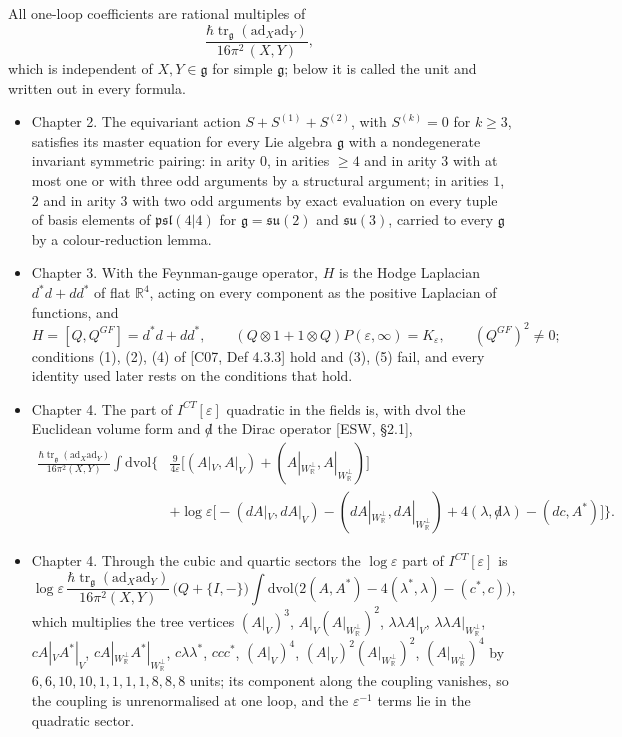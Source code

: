 All one-loop coefficients are rational multiples of
\[
\frac{\hbar\operatorname{tr}_{\mathfrak g}(\mathrm{ad}_X\mathrm{ad}_Y)}{16\pi^2\,(X,Y)},
\]
which is independent of $X,Y\in\mathfrak g$ for simple $\mathfrak g$; below it is called the unit and written out in every formula.

\begin{itemize}
\item Chapter 2. The equivariant action $S+S^{(1)}+S^{(2)}$, with $S^{(k)}=0$ for $k\ge3$, satisfies its master equation for every Lie algebra $\mathfrak g$ with a nondegenerate invariant symmetric pairing: in arity $0$, in arities $\ge4$ and in arity $3$ with at most one or with three odd arguments by a structural argument; in arities $1$, $2$ and in arity $3$ with two odd arguments by exact evaluation on every tuple of basis elements of $\mathfrak{psl}(4|4)$ for $\mathfrak g=\mathfrak{su}(2)$ and $\mathfrak{su}(3)$, carried to every $\mathfrak g$ by a colour-reduction lemma.
\item Chapter 3. With the Feynman-gauge operator, $H$ is the Hodge Laplacian $d^*d+dd^*$ of flat $\mathbb R^4$, acting on every component as the positive Laplacian of functions, and
\[
H=[Q,Q^{GF}]=d^*d+dd^*,\qquad (Q\otimes1+1\otimes Q)P(\varepsilon,\infty)=K_\varepsilon,\qquad (Q^{GF})^2\neq0 ;
\]
conditions (1), (2), (4) of [C07, Def 4.3.3] hold and (3), (5) fail, and every identity used later rests on the conditions that hold.
\item Chapter 4. The part of $I^{CT}[\varepsilon]$ quadratic in the fields is, with $\mathrm{dvol}$ the Euclidean volume form and ${\not d}$ the Dirac operator [ESW, §2.1],
\[
\begin{aligned}
\frac{\hbar\operatorname{tr}_{\mathfrak g}(\mathrm{ad}_X\mathrm{ad}_Y)}{16\pi^2(X,Y)}\int\mathrm{dvol}\Big\{&\frac{9}{4\varepsilon}\Big[(A|_V,A|_V)+(A|_{W_{\mathbb R}^\perp},A|_{W_{\mathbb R}^\perp})\Big]\\
&+\log\varepsilon\Big[-(dA|_V,dA|_V)-(dA|_{W_{\mathbb R}^\perp},dA|_{W_{\mathbb R}^\perp})+4(\lambda,{\not d}\lambda)-(dc,A^*)\Big]\Big\}.
\end{aligned}
\]
\item Chapter 4. Through the cubic and quartic sectors the $\log\varepsilon$ part of $I^{CT}[\varepsilon]$ is
\[
\log\varepsilon\,\frac{\hbar\operatorname{tr}_{\mathfrak g}(\mathrm{ad}_X\mathrm{ad}_Y)}{16\pi^2(X,Y)}\,\big(Q+\{I,-\}\big)\int\mathrm{dvol}\Big(2(A,A^*)-4(\lambda^*,\lambda)-(c^*,c)\Big),
\]
which multiplies the tree vertices $(A|_V)^3$, $A|_V(A|_{W_{\mathbb R}^\perp})^2$, $\lambda\lambda A|_V$, $\lambda\lambda A|_{W_{\mathbb R}^\perp}$, $cA|_VA^*|_V$, $cA|_{W_{\mathbb R}^\perp}A^*|_{W_{\mathbb R}^\perp}$, $c\lambda\lambda^*$, $ccc^*$, $(A|_V)^4$, $(A|_V)^2(A|_{W_{\mathbb R}^\perp})^2$, $(A|_{W_{\mathbb R}^\perp})^4$ by $6,6,10,10,1,1,1,1,8,8,8$ units; its component along the coupling vanishes, so the coupling is unrenormalised at one loop, and the $\varepsilon^{-1}$ terms lie in the quadratic sector.

\end{itemize}
